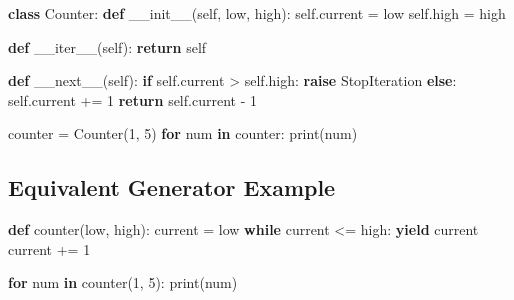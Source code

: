 \documentclass[
  letterpaper,
  DIV=11,
  numbers=noendperiod]{scrreprt}
\newenvironment{Shaded}{\begin{snugshade}}{\end{snugshade}}
\newcommand{\BuiltInTok}[1]{\textcolor[rgb]{0.00,0.23,0.31}{#1}}
\newcommand{\ControlFlowTok}[1]{\textcolor[rgb]{0.00,0.23,0.31}{\textbf{#1}}}
\newcommand{\DecValTok}[1]{\textcolor[rgb]{0.68,0.00,0.00}{#1}}
\newcommand{\FunctionTok}[1]{\textcolor[rgb]{0.28,0.35,0.67}{#1}}
\newcommand{\KeywordTok}[1]{\textcolor[rgb]{0.00,0.23,0.31}{\textbf{#1}}}
\newcommand{\NormalTok}[1]{\textcolor[rgb]{0.00,0.23,0.31}{#1}}
\newcommand{\OperatorTok}[1]{\textcolor[rgb]{0.37,0.37,0.37}{#1}}
\newcommand{\PreprocessorTok}[1]{\textcolor[rgb]{0.68,0.00,0.00}{#1}}
\newcommand{\VariableTok}[1]{\textcolor[rgb]{0.07,0.07,0.07}{#1}}
\begin{document}
\begin{Shaded}
\begin{Highlighting}[]
\KeywordTok{class}\NormalTok{ Counter:}
    \KeywordTok{def} \FunctionTok{\_\_init\_\_}\NormalTok{(}\VariableTok{self}\NormalTok{, low, high):}
        \VariableTok{self}\NormalTok{.current }\OperatorTok{=}\NormalTok{ low}
        \VariableTok{self}\NormalTok{.high }\OperatorTok{=}\NormalTok{ high}

    \KeywordTok{def} \FunctionTok{\_\_iter\_\_}\NormalTok{(}\VariableTok{self}\NormalTok{):}
        \ControlFlowTok{return} \VariableTok{self}

    \KeywordTok{def} \FunctionTok{\_\_next\_\_}\NormalTok{(}\VariableTok{self}\NormalTok{):}
        \ControlFlowTok{if} \VariableTok{self}\NormalTok{.current }\OperatorTok{\textgreater{}} \VariableTok{self}\NormalTok{.high:}
            \ControlFlowTok{raise} \PreprocessorTok{StopIteration}
        \ControlFlowTok{else}\NormalTok{:}
            \VariableTok{self}\NormalTok{.current }\OperatorTok{+=} \DecValTok{1}
            \ControlFlowTok{return} \VariableTok{self}\NormalTok{.current }\OperatorTok{{-}} \DecValTok{1}

\NormalTok{counter }\OperatorTok{=}\NormalTok{ Counter(}\DecValTok{1}\NormalTok{, }\DecValTok{5}\NormalTok{)}
\ControlFlowTok{for}\NormalTok{ num }\KeywordTok{in}\NormalTok{ counter:}
    \BuiltInTok{print}\NormalTok{(num)}
\end{Highlighting}
\end{Shaded}

\subsection{Equivalent Generator
Example}\label{equivalent-generator-example}

\begin{Shaded}
\begin{Highlighting}[]
\KeywordTok{def}\NormalTok{ counter(low, high):}
\NormalTok{    current }\OperatorTok{=}\NormalTok{ low}
    \ControlFlowTok{while}\NormalTok{ current }\OperatorTok{\textless{}=}\NormalTok{ high:}
        \ControlFlowTok{yield}\NormalTok{ current}
\NormalTok{        current }\OperatorTok{+=} \DecValTok{1}

\ControlFlowTok{for}\NormalTok{ num }\KeywordTok{in}\NormalTok{ counter(}\DecValTok{1}\NormalTok{, }\DecValTok{5}\NormalTok{):}
    \BuiltInTok{print}\NormalTok{(num)}
\end{Highlighting}
\end{Shaded}
\end{document}
